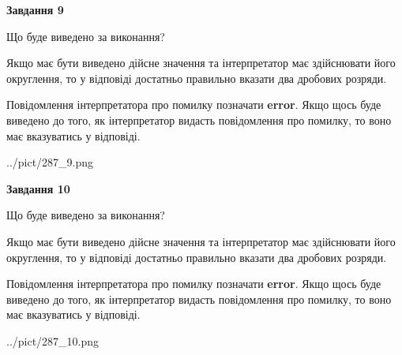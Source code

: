 \documentclass[12pt, ukrainian]{article}
\begin{document}
{\begin {Large}
{\begin {center}\textbf{Завдання 9}\end {center}}\par
Що буде виведено за виконання? \par

Якщо має бути виведено дійсне значення та інтерпретатор має здійснювати його округлення, 
то у відповіді достатньо правильно вказати два дробових розряди.

Повідомлення інтерпретатора про помилку позначати \textbf{error}.
Якщо щось буде виведено до того, як інтерпретатор видасть повідомлення про помилку, 
то воно має вказуватись у відповіді. \par

\begin{center}
	{../pict/287_9.png}
\end{center}
\newpage

{\begin {center}\textbf{Завдання 10}\end {center}}\par
Що буде виведено за виконання? \par

Якщо має бути виведено дійсне значення та інтерпретатор має здійснювати його округлення, 
то у відповіді достатньо правильно вказати два дробових розряди.

Повідомлення інтерпретатора про помилку позначати \textbf{error}.
Якщо щось буде виведено до того, як інтерпретатор видасть повідомлення про помилку, 
то воно має вказуватись у відповіді. \par

\begin{center}
	{../pict/287_10.png}
\end{center}
\newpage

\end {Large}}
\end{document}

